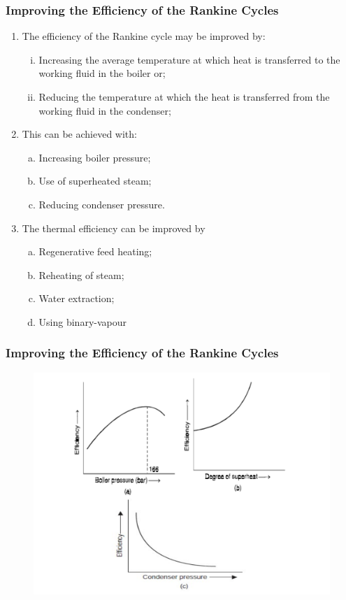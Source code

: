\documentclass[10pt,compress]{beamer}
\begin{document}
\begin{frame}
 \frametitle{Improving the Efficiency of the Rankine Cycles}
    \begin{enumerate}%
     \item <1-> The efficiency of the Rankine cycle may be improved by:
     \begin{enumerate}[(i)]%
      \item <2-> Increasing the average temperature at which heat is transferred to the working fluid in the boiler or;
      \item <3-> Reducing the temperature at which the heat is transferred from the working fluid in the condenser;
     \end{enumerate} 
     \item <4-> This can be achieved with:
      \begin{enumerate}[(a)]%
       \item <5-> Increasing boiler pressure;
       \item <6-> Use of superheated steam;
       \item <7-> Reducing condenser pressure.
      \end{enumerate}
     \item <8-> The thermal efficiency can be improved by
      \begin{enumerate}[(a)]%
       \item <9-> Regenerative feed heating;
       \item <10-> Reheating of steam;
       \item <11-> Water extraction;
       \item <12-> Using binary-vapour
      \end{enumerate}
    \end{enumerate}  
 \normalsize
\end{frame}



\begin{frame}
 \frametitle{Improving the Efficiency of the Rankine Cycles}
    \begin{figure}%
     \begin{center}
      \includegraphics[width=8.cm,clip]{./Pics/Rankine_Improving_Efficiency}
     \end{center}
    \end{figure}
 \normalsize
\end{frame}
\end{document}
